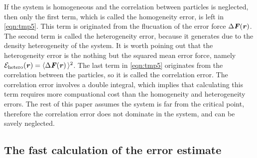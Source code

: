\documentclass[aps,pre,preprint]{revtex4}
\renewcommand{\v}[1]{\textbf{\textit{#1}}}
\begin{document}
If the system is homogeneous and the correlation between particles is
neglected, then only the first term, which is called the homogeneity
error, is left in \eqref{eqn:tmp5}. This term is originated from the
flucuation of the error force $\Delta\v F(\v r)$. The second term is
called the heterogeneity error, because it generates due to the
density heterogeneity of the system. It is worth poining out that the
heterogeneity error is the nothing but the squared mean error force,
namely $\mathcal E_{\textrm{hetero}}(\v r) = \langle\Delta\v F(\v
r)\,\rangle^2$.  The last term in \eqref{eqn:tmp5} originates from the
correlation between the particles, so it is called the correlation
error.  The correlation error involves a double integral, which
implies that calculating this term requires more compuational cost
than the homogeneity and heterogeneity errors. The rest of this paper
assumes the system is far from the critical point, therefore the
correlation error does not dominate in the system, and can be savely
neglected.



\subsection{The fast calculation of the error estimate}\label{sec:tmp1.3}
\end{document}
